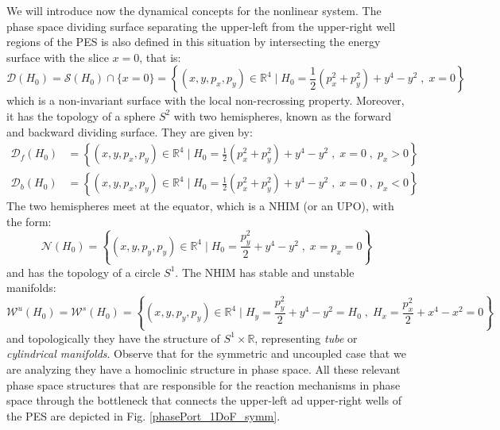 \documentclass[10pt,aps,onecolumn,superscriptaddress]{revtex4-2}
\begin{document}
	We will introduce now the dynamical concepts for  the nonlinear system. The phase space dividing surface separating the upper-left from the upper-right well regions of the PES is also defined in this situation by intersecting the energy surface with the slice $x = 0$, that is:
	\begin{equation}
	\mathcal{D}\left(H_0\right) = \mathcal{S}\left(H_0\right) \cap \lbrace x = 0 \rbrace = \left\{\left(x,y,p_x,p_y\right) \in \mathbb{R}^4 \; \bigg| \; H_0 = \frac{1}{2}\left(p_x^2+p_y^2\right) + y^4 - y^2 \;,\; x = 0 \right\}
	\label{ds_sym_unc}
	\end{equation}
	which is a non-invariant surface with the local non-recrossing property. Moreover, it has the topology of a sphere $S^2$ with two hemispheres, known as the forward and backward dividing surface. They are given by:
	\begin{equation}
	\begin{split}
	\mathcal{D}_{f}(H_0) &= \left\{\left(x,y,p_x,p_y\right) \in \mathbb{R}^4 \; \bigg| \; H_0 = \frac{1}{2}\left(p_x^2+p_y^2\right) + y^4 - y^2 \;,\; x = 0 \;,\; p_x > 0 \right\} \\
	\mathcal{D}_{b}(H_0) &= \left\{\left(x,y,p_x,p_y\right) \in \mathbb{R}^4 \; \bigg| \; H_0 = \frac{1}{2}\left(p_x^2+p_y^2\right) + y^4 - y^2 \;,\; x = 0 \;,\; p_x < 0 \right\}
	\end{split}
	\end{equation}
	The two hemispheres meet at the equator, which is a NHIM (or an UPO), with the form:
	\begin{equation}
	\mathcal{N}(H_0) = \left\{\left(x,y,p_y,p_y\right) \in \mathbb{R}^4 \; \bigg| \; H_0 = \frac{p_y^2}{2} + y^4 - y^2 \;,\; x = p_x = 0 \right\}
	\end{equation}
	and has the topology of a circle $S^1$. The NHIM has stable and unstable manifolds:
	\begin{equation}
	\mathcal{W}^{u}(H_0) = \mathcal{W}^{s}(H_0) = \left\{\left(x,y,p_y,p_y\right) \in \mathbb{R}^4 \; \bigg| \; H_y = \frac{p_y^2}{2} + y^4 - y^2 = H_0 \;,\; H_x = \frac{p_x^2}{2} + x^4 - x^2 = 0 \right\}
	\end{equation}
	and topologically they have the structure of $S^1 \times \mathbb{R}$, representing \textit{tube} or \textit{cylindrical manifolds}. Observe that for the symmetric and uncoupled case that we are analyzing they have a homoclinic structure in phase space. All these relevant phase space structures that are responsible for the reaction mechanisms in phase space through the bottleneck that connects the upper-left ad upper-right wells of the PES are depicted in Fig. \ref{phasePort_1DoF_symm}.
	
\end{document}
